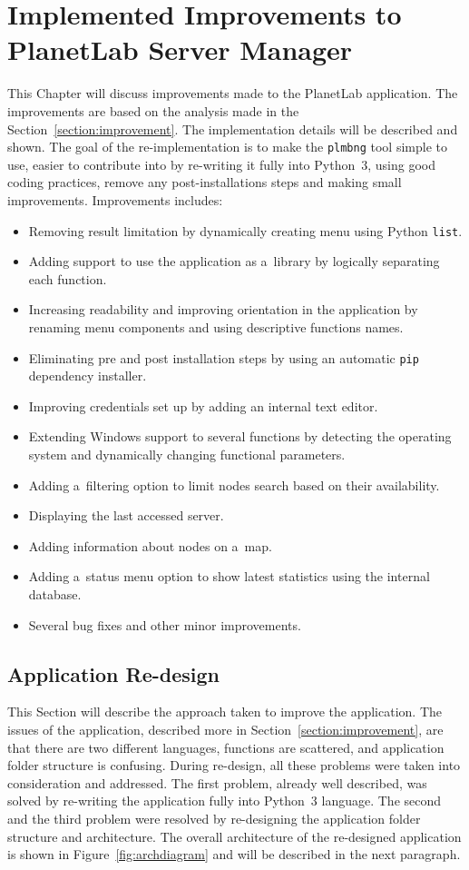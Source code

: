 \chapter{Implemented Improvements to PlanetLab Server Manager}
\label{chapter:improve}
This Chapter will discuss improvements made to the PlanetLab application. The improvements are based on the analysis made in the Section~\ref{section:improvement}. The implementation details will be described and shown. The goal of the re-implementation is to make the \texttt{plmbng} tool simple to use, easier to contribute into by re-writing it fully into Python~3, using good coding practices, remove any post-installations steps and making small improvements. Improvements includes:
\begin{itemize}
	\item Removing result limitation by dynamically creating menu using Python \texttt{list}.
	\item Adding support to use the application as a~library by logically separating each function.
	\item Increasing readability and improving orientation in the application by renaming menu components and using descriptive functions names.
	\item Eliminating pre and post installation steps by using an automatic \texttt{pip} dependency installer.
	\item Improving credentials set up by adding an internal text editor.
	\item Extending Windows support to several functions by detecting the operating system and dynamically changing functional parameters.
	\item Adding a~filtering option to limit nodes search based on their availability.
	\item Displaying the last accessed server.
	\item Adding information about nodes on a~map.
	\item Adding a~status menu option to show latest statistics using the internal database.
	\item Several bug fixes and other minor improvements.
\end{itemize}

\section{Application Re-design}
\label{section:redesign}
This Section will describe the approach taken to improve the application. The issues of the application, described more in Section~\ref{section:improvement}, are that there are two different languages, functions are scattered, and application folder structure is confusing. During re-design, all these problems were taken into consideration and addressed. The first problem, already well described, was solved by re-writing the application fully into Python~3 language. The second and the third problem were resolved by re-designing the application folder structure and architecture. The overall architecture of the re-designed application is shown in Figure~\ref{fig:archdiagram} and will be described in the next paragraph.\\


